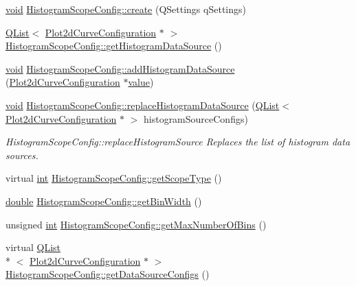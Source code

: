 \begin{DoxyCompactItemize}
\hyperlink{group___u_a_v_objects_plugin_ga444cf2ff3f0ecbe028adce838d373f5c}{void} \hyperlink{group___scope_plugin_ga23b4c258bf17b6bc16c3dc75ea7d98eb}{Histogram\-Scope\-Config\-::create} (Q\-Settings q\-Settings)
\item 
\hyperlink{class_q_list}{Q\-List}$<$ \hyperlink{struct_plot2d_curve_configuration}{Plot2d\-Curve\-Configuration} $\ast$ $>$ \hyperlink{group___scope_plugin_gac01f208b6d79e28b2f148abc13d6b0b9}{Histogram\-Scope\-Config\-::get\-Histogram\-Data\-Source} ()
\item 
\hyperlink{group___u_a_v_objects_plugin_ga444cf2ff3f0ecbe028adce838d373f5c}{void} \hyperlink{group___scope_plugin_ga2092a20c3f43c9eb68d370e7dc98cd2b}{Histogram\-Scope\-Config\-::add\-Histogram\-Data\-Source} (\hyperlink{struct_plot2d_curve_configuration}{Plot2d\-Curve\-Configuration} $\ast$\hyperlink{glext_8h_aa0e2e9cea7f208d28acda0480144beb0}{value})
\item 
\hyperlink{group___u_a_v_objects_plugin_ga444cf2ff3f0ecbe028adce838d373f5c}{void} \hyperlink{group___scope_plugin_gaa036bf883eaa724bb577ee9de902dce1}{Histogram\-Scope\-Config\-::replace\-Histogram\-Data\-Source} (\hyperlink{class_q_list}{Q\-List}$<$ \hyperlink{struct_plot2d_curve_configuration}{Plot2d\-Curve\-Configuration} $\ast$ $>$ histogram\-Source\-Configs)
\begin{DoxyCompactList}\small\item\em Histogram\-Scope\-Config\-::replace\-Histogram\-Source Replaces the list of histogram data sources. \end{DoxyCompactList}\item 
virtual \hyperlink{ioapi_8h_a787fa3cf048117ba7123753c1e74fcd6}{int} \hyperlink{group___scope_plugin_ga232680e8671b7a4e205a11f5f164aa1a}{Histogram\-Scope\-Config\-::get\-Scope\-Type} ()
\item 
\hyperlink{_super_l_u_support_8h_a8956b2b9f49bf918deed98379d159ca7}{double} \hyperlink{group___scope_plugin_gac7c220940b1b3c4c51997623b0268f3d}{Histogram\-Scope\-Config\-::get\-Bin\-Width} ()
\item 
unsigned \hyperlink{ioapi_8h_a787fa3cf048117ba7123753c1e74fcd6}{int} \hyperlink{group___scope_plugin_ga4b72da75ea27852393740b47bf6f6ae5}{Histogram\-Scope\-Config\-::get\-Max\-Number\-Of\-Bins} ()
\item 
virtual \hyperlink{class_q_list}{Q\-List}\\*
$<$ \hyperlink{struct_plot2d_curve_configuration}{Plot2d\-Curve\-Configuration} $\ast$ $>$ \hyperlink{group___scope_plugin_ga79e96fd6c2de93da275c9d1b3c568e95}{Histogram\-Scope\-Config\-::get\-Data\-Source\-Configs} ()

\end{DoxyCompactItemize}
